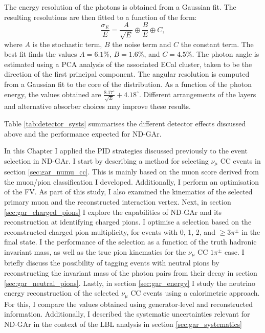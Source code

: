 The energy resolution of the photons is obtained from a Gaussian fit. The resulting resolutions are then fitted to a function of the form:
\begin{equation}
    \frac{\sigma_{E}}{E} = \frac{A}{\sqrt{E}} \oplus \frac{B}{E} \oplus C,
\end{equation}
where $A$ is the stochastic term, $B$ the noise term and $C$ the constant term. The best fit finds the values $A=6.1\%$, $B=1.6\%$, and $C=4.5\%$. The photon angle is estimated using a PCA analysis of the associated ECal cluster, taken to be the direction of the first principal component. The angular resolution is computed from a Gaussian fit to the core of the distribution. As a function of the photon energy, the values obtained are $\frac{8.17^{\circ}}{\sqrt{E}} + 4.18^{\circ}$. Different arrangements of the layers and alternative absorber choices may improve these results.

Table \ref{tab:detector_systs} summarises the different detector effects discussed above and the performance expected for ND-GAr.

In this Chapter I applied the PID strategies discussed previously to the event selection in ND-GAr. I start by describing a method for selecting $\nu_{\mu}$ CC events in section \ref{sec:gar_numu_cc}. This is mainly based on the muon score derived from the muon/pion classification I developed. Additionally, I perform an optimisation of the FV. As part of this study, I also examined the kinematics of the selected primary muon and the reconstructed interaction vertex. Next, in section \ref{sec:gar_charged_pions} I explore the capabilities of ND-GAr and its reconstruction at identifying charged pions. I optimise a selection based on the reconstructed charged pion multiplicity, for events with 0, 1, 2, and $\geq 3 \pi^{\pm}$ in the final state. I the performance of the selection as a function of the truth hadronic invariant mass, as well as the true pion kinematics for the $\nu_{\mu}$ CC $1\pi^{\pm}$ case. I briefly discuss the possibility of tagging events with neutral pions by reconstructing the invariant mass of the photon pairs from their decay in section \ref{sec:gar_neutral_pions}. Lastly, in section \ref{sec:gar_energy} I study the neutrino energy reconstruction of the selected $\nu_{\mu}$ CC events using a calorimetric approach. For this, I compare the values obtained using generator-level and reconstructed information. Additionally, I described the systematic uncertainties relevant for ND-GAr in the context of the LBL analysis in section \ref{sec:gar_systematics}